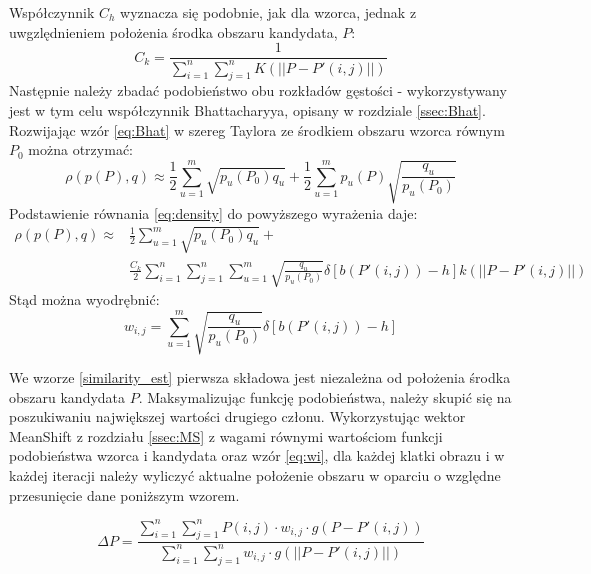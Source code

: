 Współczynnik $C_h$ wyznacza się podobnie, jak dla wzorca, jednak z uwgzlędnieniem położenia środka obszaru kandydata, $P$:
\begin{equation}
C_k=\frac{1}{\sum_{i=1}^{n}\sum_{j=1}^{n}K(||P-P'(i,j)||)} 
\end{equation}
Następnie należy zbadać podobieństwo obu rozkładów gęstości - wykorzystywany jest w tym celu współczynnik Bhattacharyya, opisany w rozdziale \ref{ssec:Bhat}. Rozwijając wzór \ref{eq:Bhat} w szereg Taylora ze środkiem obszaru wzorca równym $P_0$ można otrzymać:
\begin{equation}
\label{eq:approx}
\rho(p(P),q)\approx\frac{1}{2}\sum_{u=1}^{m}\sqrt{p_u(P_0)q_u} + \frac{1}{2}\sum_{u=1}^{m}p_u(P)\sqrt{\frac{q_u}{p_u(P_0)}}
\end{equation}
Podstawienie równania \ref{eq:density} do powyższego wyrażenia daje:
\begin{equation}
\label{similarity_est}
\begin{aligned}
\rho(p(P),q)\approx & \frac{1}{2}\sum_{u=1}^{m}\sqrt{p_u(P_0)q_u} + \\ & \frac{C_k}{2}\sum_{i=1}^{n}\sum_{j=1}^{n}\sum_{u=1}^{m}\sqrt{\frac{q_u}{p_u(P_0)}}\delta[b(P'(i,j))-h] k(||P-P'(i,j)||)
\end{aligned}
\end{equation}
Stąd można wyodrębnić:
\begin{equation}
\label{eq:wi}
w_{i,j}=\sum_{u=1}^{m}\sqrt{\frac{q_u}{p_u(P_0)}}\delta[b(P'(i,j))-h]
\end{equation}


We wzorze \ref{similarity_est} pierwsza składowa jest niezależna od położenia środka obszaru kandydata $P$. Maksymalizując funkcję podobieństwa, należy skupić się na poszukiwaniu największej wartości drugiego członu. 
Wykorzystując wektor MeanShift z rozdziału \ref{ssec:MS} z wagami równymi wartościom funkcji podobieństwa wzorca i kandydata oraz wzór \ref{eq:wi}, dla każdej klatki obrazu i w każdej iteracji należy wyliczyć aktualne położenie obszaru w oparciu o względne przesunięcie dane poniższym wzorem.

\begin{equation}
\label{eq:position}
\Delta P=\frac{\sum_{i=1}^{n}\sum_{j=1}^{n}P(i,j)\cdot w_{i,j}\cdot g(P-P'(i,j))}{\sum_{i=1}^{n}\sum_{j=1}^{n}w_{i,j}\cdot g(||P-P'(i,j)||)}
\end{equation}

